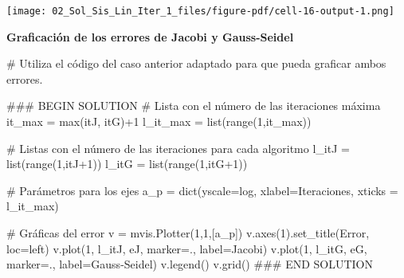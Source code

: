 \documentclass[
  letterpaper,
  DIV=11,
  numbers=noendperiod]{scrreprt}
\newenvironment{Shaded}{\begin{snugshade}}{\end{snugshade}}
\newcommand{\BuiltInTok}[1]{\textcolor[rgb]{0.00,0.23,0.31}{#1}}
\newcommand{\CommentTok}[1]{\textcolor[rgb]{0.37,0.37,0.37}{#1}}
\newcommand{\DecValTok}[1]{\textcolor[rgb]{0.68,0.00,0.00}{#1}}
\newcommand{\NormalTok}[1]{\textcolor[rgb]{0.00,0.23,0.31}{#1}}
\newcommand{\OperatorTok}[1]{\textcolor[rgb]{0.37,0.37,0.37}{#1}}
\newcommand{\RegionMarkerTok}[1]{\textcolor[rgb]{0.00,0.23,0.31}{#1}}
\newcommand{\StringTok}[1]{\textcolor[rgb]{0.13,0.47,0.30}{#1}}
\begin{document}
\texttt{[image: 02\_Sol\_Sis\_Lin\_Iter\_1\_files/figure-pdf/cell-16-output-1.png]}

\textbf{Graficación de los errores de Jacobi y Gauss-Seidel}

\begin{Shaded}
\begin{Highlighting}[]
\CommentTok{\# Utiliza el código del caso anterior adaptado para que pueda graficar ambos errores.}

\CommentTok{\#\#\# }\RegionMarkerTok{BEGIN}\CommentTok{ SOLUTION}
\CommentTok{\# Lista con el número de las iteraciones máxima}
\NormalTok{it\_max }\OperatorTok{=} \BuiltInTok{max}\NormalTok{(itJ, itG)}\OperatorTok{+}\DecValTok{1}
\NormalTok{l\_it\_max }\OperatorTok{=} \BuiltInTok{list}\NormalTok{(}\BuiltInTok{range}\NormalTok{(}\DecValTok{1}\NormalTok{,it\_max)) }

\CommentTok{\# Listas con el número de las iteraciones para cada algoritmo}
\NormalTok{l\_itJ }\OperatorTok{=} \BuiltInTok{list}\NormalTok{(}\BuiltInTok{range}\NormalTok{(}\DecValTok{1}\NormalTok{,itJ}\OperatorTok{+}\DecValTok{1}\NormalTok{)) }
\NormalTok{l\_itG }\OperatorTok{=} \BuiltInTok{list}\NormalTok{(}\BuiltInTok{range}\NormalTok{(}\DecValTok{1}\NormalTok{,itG}\OperatorTok{+}\DecValTok{1}\NormalTok{)) }

\CommentTok{\# Parámetros para los ejes}
\NormalTok{a\_p }\OperatorTok{=} \BuiltInTok{dict}\NormalTok{(yscale}\OperatorTok{=}\StringTok{\textquotesingle{}log\textquotesingle{}}\NormalTok{, xlabel}\OperatorTok{=}\StringTok{\textquotesingle{}Iteraciones\textquotesingle{}}\NormalTok{, xticks }\OperatorTok{=}\NormalTok{ l\_it\_max)}

\CommentTok{\# Gráficas del error}
\NormalTok{v }\OperatorTok{=}\NormalTok{ mvis.Plotter(}\DecValTok{1}\NormalTok{,}\DecValTok{1}\NormalTok{,[a\_p]) }
\NormalTok{v.axes(}\DecValTok{1}\NormalTok{).set\_title(}\StringTok{\textquotesingle{}Error\textquotesingle{}}\NormalTok{, loc}\OperatorTok{=}\StringTok{\textquotesingle{}left\textquotesingle{}}\NormalTok{)}
\NormalTok{v.plot(}\DecValTok{1}\NormalTok{, l\_itJ, eJ, marker}\OperatorTok{=}\StringTok{\textquotesingle{}.\textquotesingle{}}\NormalTok{, label}\OperatorTok{=}\StringTok{\textquotesingle{}Jacobi\textquotesingle{}}\NormalTok{)}
\NormalTok{v.plot(}\DecValTok{1}\NormalTok{, l\_itG, eG, marker}\OperatorTok{=}\StringTok{\textquotesingle{}.\textquotesingle{}}\NormalTok{, label}\OperatorTok{=}\StringTok{\textquotesingle{}Gauss{-}Seidel\textquotesingle{}}\NormalTok{)}
\NormalTok{v.legend()}
\NormalTok{v.grid()}
\CommentTok{\#\#\# }\RegionMarkerTok{END}\CommentTok{ SOLUTION}
\end{Highlighting}
\end{Shaded}
\end{document}
